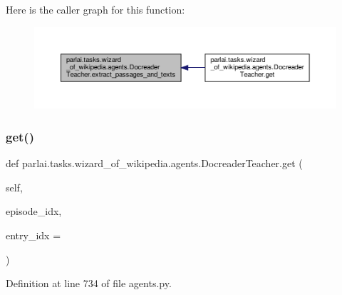 Here is the caller graph for this function\+:
\nopagebreak
\begin{figure}[H]
\begin{center}
\leavevmode
\includegraphics[width=350pt]{classparlai_1_1tasks_1_1wizard__of__wikipedia_1_1agents_1_1DocreaderTeacher_a6ffe825efcf1e3db66262312f6a6dead_icgraph}
\end{center}
\end{figure}
\mbox{\label{classparlai_1_1tasks_1_1wizard__of__wikipedia_1_1agents_1_1DocreaderTeacher_a759c5a19439387e69d272bb719c568c3}} 
\subsubsection{\texorpdfstring{get()}{get()}}
{\footnotesize\ttfamily def parlai.\+tasks.\+wizard\+\_\+of\+\_\+wikipedia.\+agents.\+Docreader\+Teacher.\+get (\begin{DoxyParamCaption}\item[{}]{self,  }\item[{}]{episode\+\_\+idx,  }\item[{}]{entry\+\_\+idx = {} }\end{DoxyParamCaption})}



Definition at line 734 of file agents.\+py.



